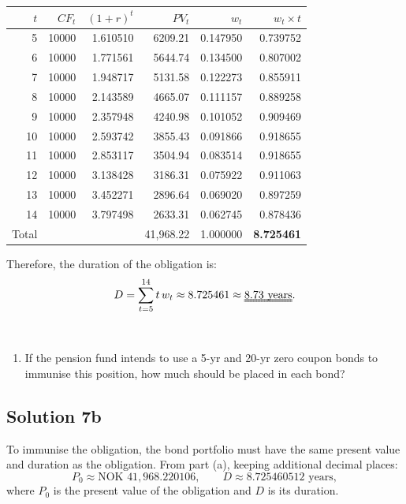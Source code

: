 \documentclass[12]{article}
\begin{document}
\begin{table}[H]
    \centering
    {\color{blue}
    \begin{tabular}{rrrrrr}
    \toprule
    $t$ & $CF_t$ & $(1+r)^t$ & $PV_t$ & $w_t$ & $w_t\times t$\\
    \midrule
    5  & 10000 & 1.610510 & 6209.21 & 0.147950 & 0.739752\\
    6  & 10000 & 1.771561 & 5644.74 & 0.134500 & 0.807002\\
    7  & 10000 & 1.948717 & 5131.58 & 0.122273 & 0.855911\\
    8  & 10000 & 2.143589 & 4665.07 & 0.111157 & 0.889258\\
    9  & 10000 & 2.357948 & 4240.98 & 0.101052 & 0.909469\\
    10 & 10000 & 2.593742 & 3855.43 & 0.091866 & 0.918655\\
    11 & 10000 & 2.853117 & 3504.94 & 0.083514 & 0.918655\\
    12 & 10000 & 3.138428 & 3186.31 & 0.075922 & 0.911063\\
    13 & 10000 & 3.452271 & 2896.64 & 0.069020 & 0.897259\\
    14 & 10000 & 3.797498 & 2633.31 & 0.062745 & 0.878436\\
    \midrule
    Total & & & 41,968.22 & 1.000000 & \textbf{8.725461}\\
    \bottomrule
    \end{tabular}}
\end{table}

\noindent Therefore, the duration of the obligation is:
\[
D=\sum_{t=5}^{14}t\,w_t
\approx8.725461
\approx\text{\uuline{8.73 years}}.
\]






\noindent
\\
\color{black}
\begin{enumerate}
     \item[b)] If the pension fund intends to use a 5-yr and 20-yr zero coupon bonds to immunise this position, how much should be placed in each bond? 
\end{enumerate}


\color{blue}
\subsection*{Solution 7b} 
\noindent To immunise the obligation, the bond portfolio must have the same present value and duration as the obligation. From part (a), keeping additional decimal places:
\[
P_0\approx\text{NOK }41{,}968.220106,
\qquad
D\approx8.725460512\text{ years},
\]
where $P_0$ is the present value of the obligation and $D$ is its duration.
\end{document}
